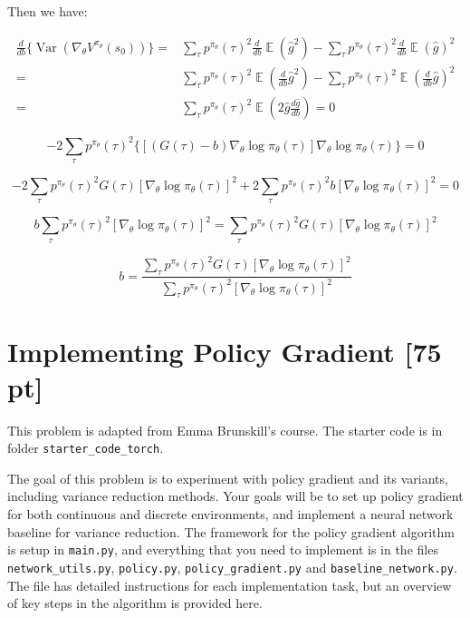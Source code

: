 \documentclass[11pt]{article}
\theoremstyle{case}
\DeclareMathOperator{\E}{\mathbb{E}}
\DeclareMathOperator{\Var}{\text{Var}}
\begin{document}
\begin{enumerate}[label=(\alph*)]
\begin{shaded}
Then we have:

\begin{align*}
 \frac{d}{d b} \{ \Var(\nabla_{\theta} V^{\pi_\theta}(s_0) ) \} 
 = & \sum_\tau p^{\pi_\theta}(\tau)^2 \frac{d}{d b}\E ( \hat{g}^2) - \sum_\tau p^{\pi_\theta}(\tau)^2 \frac{d}{d b}\E (\hat{g})^2\\
 = & \sum_\tau p^{\pi_\theta}(\tau)^2 \E (\frac{d}{d b} \hat{g}^2) - \sum_\tau p^{\pi_\theta}(\tau)^2 \E (\frac{d}{d b} \hat{g})^2\\
=& \sum_\tau p^{\pi_\theta}(\tau)^2 \E ( 2 \hat{g} \frac{d \hat{g}}{d b} ) = 0
\end{align*}

$$- 2 \sum_\tau p^{\pi_\theta}(\tau)^2 \{  [ (G(\tau)-b) \nabla_{\theta} \log \pi_\theta (\tau)] \nabla_{\theta} \log \pi_\theta (\tau) \} = 0 $$

$$- 2 \sum_\tau p^{\pi_\theta}(\tau)^2 G(\tau) [\nabla_{\theta} \log \pi_\theta (\tau)]^2 + 2 \sum_\tau p^{\pi_\theta}(\tau)^2 b [\nabla_{\theta} \log \pi_\theta (\tau)]^2= 0 $$

$$  b \sum_\tau p^{\pi_\theta}(\tau)^2 [\nabla_{\theta} \log \pi_\theta (\tau)]^2 =  \sum_\tau p^{\pi_\theta}(\tau)^2 G(\tau) [\nabla_{\theta} \log \pi_\theta (\tau)]^2 $$

$$b = \frac{\sum_\tau p^{\pi_\theta}(\tau)^2 G(\tau) [\nabla_{\theta} \log \pi_\theta (\tau)]^2}{\sum_\tau p^{\pi_\theta}(\tau)^2 [\nabla_{\theta} \log \pi_\theta (\tau)]^2}$$
    \end{shaded}
\end{enumerate}

\newpage
\section{Implementing Policy Gradient [75 pt]}
This problem is adapted from Emma Brunskill's course.
The starter code is in folder \texttt{starter\_code\_torch}.

The goal of this problem is to experiment with policy gradient and its variants, including variance reduction methods. Your goals will be to set up policy gradient for both continuous and discrete environments, and implement a neural network baseline for variance reduction. The framework for the policy gradient algorithm is setup in \texttt{main.py}, and everything that you need to implement is in the files \texttt{network\_utils.py}, \texttt{policy.py}, \texttt{policy\_gradient.py} and \texttt{baseline\_network.py}. The file has detailed instructions for each implementation task, but an overview of key steps in the algorithm is provided here.
\end{document}
